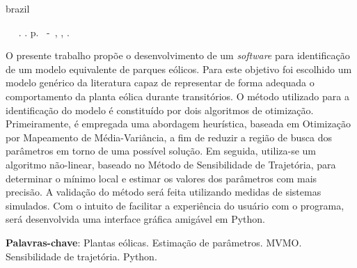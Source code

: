 \setlength{\absparsep}{18pt} %

\begin{resumo}[Resumo]

\begin{otherlanguage*}{brazil}

\begin{flushleft} 
	\setlength{\absparsep}{0pt} %
	\SingleSpacing 
	\imprimirautorabr~ ~\textbf{\imprimirtitleabstract}.	\imprimirdata. \pageref{LastPage}p. 
	\imprimirtipotrabalho~-~\imprimirinstituicao, \imprimirlocal, \imprimirdata. 
\end{flushleft}

\OnehalfSpacing 			

O presente trabalho prop\~oe o desenvolvimento de um \textit{software} para identifica\c{c}\~ao de um modelo equivalente de parques e\'olicos. Para este objetivo foi escolhido um modelo gen\'erico da literatura capaz de representar de forma adequada o comportamento da planta e\'olica durante transit\'orios. O m\'etodo utilizado para a identifica\c{c}\~ao do modelo \'e constitu\'ido por dois algoritmos de otimiza\c{c}\~ao. Primeiramente, \'e empregada uma abordagem heur\'istica, baseada em Otimiza\c{c}\~ao por Mapeamento de M\'edia-Vari\^ancia, a fim de reduzir a regi\~ao de busca dos par\^ametros em torno de uma poss\'ivel solu\c{c}\~ao. Em seguida, utiliza-se um algoritmo n\~ao-linear, baseado no M\'etodo de Sensibilidade de Trajet\'oria, para determinar o m\'inimo local e estimar os valores dos par\^ametros com mais precis\~ao. A valida\c{c}\~ao do m\'etodo ser\'a feita utilizando medidas de sistemas simulados. Com o intuito de facilitar a experi\^encia do usu\'ario com o programa, ser\'a desenvolvida uma interface gr\'afica amig\'avel em Python.
 

\textbf{Palavras-chave}: Plantas e\'olicas. Estima\c{c}\~ao de par\^ametros. MVMO. Sensibilidade de trajet\'oria. Python.

\end{otherlanguage*}

\end{resumo}